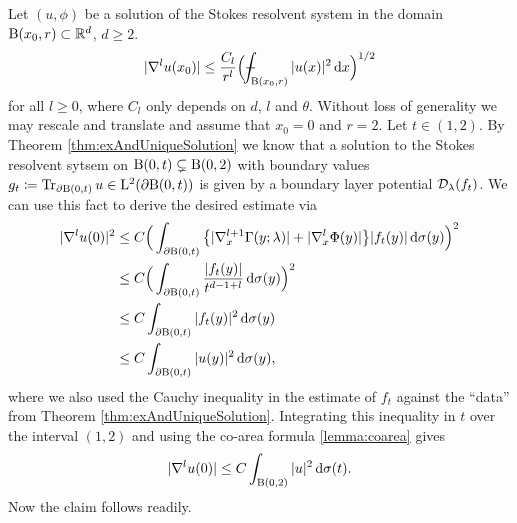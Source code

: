 \begin{rem}
  Let $(u,\phi)$ be a solution of the Stokes resolvent system in the domain $\mathrm{B}(x_0, r) \subset \mathbb{R}^d$, $d \geq 2$.
  \begin{align}
    \label{eq:interiorEstimateDoubleLayer}
    |\nabla^l u(x_0) | \leq \frac{C_l}{r^l} \Big( \dashint_{\BB(x_0, r)} |u(x)|^2 \d x \Big)^{1/2}
  \end{align}
  for all $l \geq 0$, where $C_l$ only depends on $d$, $l$ and $\theta$.
  Without loss of generality we may rescale and translate and assume that $x_0 = 0$ and $r = 2$.
  Let $t \in (1,2)$. By Theorem \ref{thm:exAndUniqueSolution} we know that a solution to the Stokes resolvent sytsem on $\mathrm{B}(0, t) \subsetneq \mathrm{B}(0,2)$ with boundary values $g_t \coloneqq \operatorname{Tr}_{\partial\mathrm{B}(0,t)} u \in \mathrm{L}^2(\partial\mathrm{B}(0,t))$ is given by a boundary layer potential $\mathcal{D}_\lambda(f_t)$.
  We can use this fact to derive the desired estimate via
  \begin{align*}
    |\nabla^l u(0)|^2 
    &\leq C \Big( \int_{\partial \mathrm{B}(0, t)} \big\{ |\nabla_x^{l+1} \Gamma(y; \lambda)|  + |\nabla_x^l \Phi(y) | \big\} |f_t(y)| \, {\operatorname{d}\!{\sigma}}(y)\Big)^2 \\
    &\leq  C \Big( \int_{\partial \mathrm{B}(0,t)} \frac{|f_t(y)|}{t^{d - 1 + l}}  \, {\operatorname{d}\!{\sigma}}(y)\Big)^2 \\
    &\leq  C \int_{\partial \mathrm{B}(0,t)} |f_t(y)|^2  \, {\operatorname{d}\!{\sigma}}(y) \\
    &\leq C \int_{\partial \mathrm{B}(0,t)} |u(y)|^2 \, {\operatorname{d}\!{\sigma}}(y), 
  \end{align*}
  where we also used the Cauchy inequality in the estimate of $f_t$ against the ``data'' from Theorem \ref{thm:exAndUniqueSolution}.
  Integrating this inequality in $t$ over the interval $(1,2)$ and using the co-area formula \ref{lemma:coarea} gives 
  \begin{align*}
    |\nabla^l u(0)| \leq C \int_{\mathrm{B}(0,2)} |u|^2 \, {\operatorname{d}\!{\sigma}}(t).
  \end{align*}
  Now the claim follows readily.
\end{rem}

